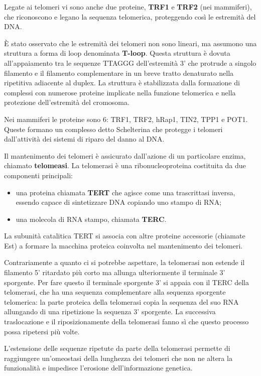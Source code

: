 \documentclass[11pt]{book}
\begin{document}
Legate ai telomeri vi sono anche due proteine, \textbf{TRF1} e
\textbf{TRF2} (nei mammiferi), che riconoscono e legano la sequenza
telomerica, proteggendo così le estremità del DNA.

È stato osservato che le estremità dei telomeri non sono lineari, ma
assumono una struttura a forma di loop denominata \textbf{T-loop}.
Questa struttura è dovuta all'appaiamento tra le sequenze TTAGGG
dell'estremità 3' che protrude a singolo filamento e il filamento
complementare in un breve tratto denaturato nella ripetitiva adiacente
al duplex. La struttura è stabilizzata dalla formazione di complessi con
numerose proteine implicate nella funzione telomerica e nella protezione
dell'estremità del cromosoma.

Nei mammiferi le proteine sono 6: TRF1, TRF2, hRap1, TIN2, TPP1 e POT1.
Queste formano un complesso detto Schelterina che protegge i telomeri
dall'attività dei sistemi di riparo del danno al DNA.

Il mantenimento dei telomeri è assicurato dall'azione di un particolare
enzima, chiamato \textbf{telomeasi}. La telomerasi è una
ribonucleoproteina costituita da due componenti principali:

\begin{itemize}
\itemsep1pt\parskip0pt
\item
  una proteina chiamata \textbf{TERT} che agisce come una trascrittasi
  inversa, essendo capace di sintetizzare DNA copiando uno stampo di
  RNA;
\item
  una molecola di RNA stampo, chiamata \textbf{TERC}.
\end{itemize}

La subunità catalitica TERT si associa con altre proteine accessorie
(chiamate Est) a formare la macchina proteica coinvolta nel mantenimento
dei telomeri.

Contrariamente a quanto ci si potrebbe aspettare, la telomerasi non
estende il filamento 5' ritardato più corto ma allunga ulteriormente il
terminale 3' sporgente. Per fare questo il terminale sporgente 3' si
appaia con il TERC della telomerasi, che ha una sequenza complementare
alla sequenza sporgente telomerica: la parte proteica della telomerasi
copia la sequenza del suo RNA allungando di una ripetizione la sequenza
3' sporgente. La successiva traslocazione e il riposizionamente della
telomerasi fanno sì che questo processo possa ripetersi più volte.

L'estensione delle sequenze ripetute da parte della telomerasi permette
di raggiungere un'omeostasi della lunghezza dei telomeri che non ne
altera la funzionalità e impedisce l'erosione dell'informazione
genetica.
\end{document}
